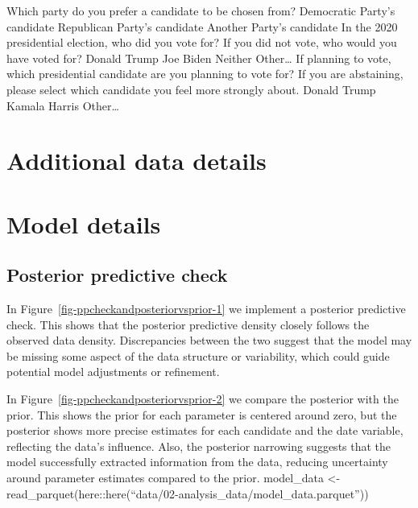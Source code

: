 \documentclass[
  letterpaper,
  DIV=11,
  numbers=noendperiod]{scrartcl}
\begin{document}
Which party do you prefer a candidate to be chosen from? Democratic
Party's candidate Republican Party's candidate Another Party's candidate
In the 2020 presidential election, who did you vote for? If you did not
vote, who would you have voted for? Donald Trump Joe Biden Neither
Other\ldots{} If planning to vote, which presidential candidate are you
planning to vote for? If you are abstaining, please select which
candidate you feel more strongly about. Donald Trump Kamala Harris
Other\ldots{}

\newpage

\hypertarget{additional-data-details}{%
\section{Additional data details}\label{additional-data-details}}

\newpage

\hypertarget{sec-model-details}{%
\section{Model details}\label{sec-model-details}}

\hypertarget{posterior-predictive-check}{%
\subsection{Posterior predictive
check}\label{posterior-predictive-check}}

In Figure~\ref{fig-ppcheckandposteriorvsprior-1} we implement a
posterior predictive check. This shows that the posterior predictive
density closely follows the observed data density. Discrepancies between
the two suggest that the model may be missing some aspect of the data
structure or variability, which could guide potential model adjustments
or refinement.

In Figure~\ref{fig-ppcheckandposteriorvsprior-2} we compare the
posterior with the prior. This shows the prior for each parameter is
centered around zero, but the posterior shows more precise estimates for
each candidate and the date variable, reflecting the data's influence.
Also, the posterior narrowing suggests that the model successfully
extracted information from the data, reducing uncertainty around
parameter estimates compared to the prior. model\_data \textless-
read\_parquet(here::here(``data/02-analysis\_data/model\_data.parquet''))
\end{document}
